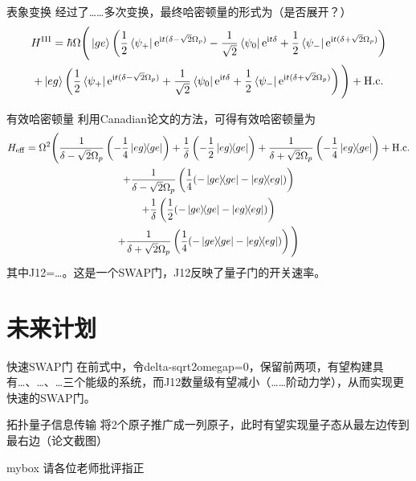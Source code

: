 \documentclass[10pt,aspectratio=43]{beamer}
\begin{document}
\begin{frame}{表象变换}
经过了……多次变换，最终哈密顿量的形式为（是否展开？）
\begin{multline}
H^{\mathrm{III}}=\hbar\Omega\Bigg(\ket{ge}\left(\frac{1}{2}\bra{\psi_+}\mathrm{e}^{\mathrm{i}t(\delta-\sqrt{2}\Omega_p)}-\frac{1}{\sqrt{2}}\bra{\psi_0}\mathrm{e}^{\mathrm{i}t \delta}+\frac{1}{2}\bra{\psi_-}\mathrm{e}^{\mathrm{i}t (\delta+\sqrt{2}\Omega_p)}\right)\\
+\ket{eg}\left(\frac{1}{2}\bra{\psi_+}\mathrm{e}^{\mathrm{i}t(\delta-\sqrt{2}\Omega_p)}+\frac{1}{\sqrt{2}}\bra{\psi_0}\mathrm{e}^{\mathrm{i}t \delta}+\frac{1}{2}\bra{\psi_-}\mathrm{e}^{\mathrm{i}t (\delta+\sqrt{2}\Omega_p)}\right)\Bigg)+\mathrm{H.c.}
\end{multline}
\end{frame}
\begin{frame}{有效哈密顿量}
利用Canadian论文的方法，可得有效哈密顿量为
\begin{multline}
H_{\mathrm{eff}}=\Omega^2\Bigg(\frac{1}{\delta-\sqrt{2}\Omega_p}\left(-\frac{1}{4}\ketbra{eg}{ge}\right)+\frac{1}{\delta}\left(-\frac{1}{2}\ketbra{eg}{ge}\right)+\frac{1}{\delta+\sqrt{2}\Omega_p}\left(-\frac{1}{4}\ketbra{eg}{ge}\right)+\mathrm{H.c.}\\
+\frac{1}{\delta-\sqrt{2}\Omega_p}\left(\frac{1}{4}(-\ketbra{ge}{ge}-\ketbra{eg}{eg})\right)\\
+\frac{1}{\delta}\left(\frac{1}{2}(-\ketbra{ge}{ge}-\ketbra{eg}{eg})\right)\\
+\frac{1}{\delta+\sqrt{2}\Omega_p}\left(\frac{1}{4}(-\ketbra{ge}{ge}-\ketbra{eg}{eg})\right)\Bigg)
\end{multline}
其中J12=…。这是一个SWAP门，J12反映了量子门的开关速率。
\end{frame}
\section{未来计划}
\begin{frame}{快速SWAP门}
在前式中，令delta-sqrt2omegap=0，保留前两项，有望构建具有…、…、…三个能级的系统，而J12数量级有望减小（……阶动力学），从而实现更快速的SWAP门。
\end{frame}
\begin{frame}{拓扑量子信息传输}
将2个原子推广成一列原子，此时有望实现量子态从最左边传到最右边（论文截图）
\end{frame}
\begin{frame}{}
\begin{center}
\begin{minipage}{1\textwidth}
 \begin{beamercolorbox}[wd=0.70\textwidth, rounded=true, shadow=true]{mybox}
\LARGE \centering 请各位老师批评指正
\end{beamercolorbox}
 \end{minipage}
\end{center}
\end{frame}
\end{document}
